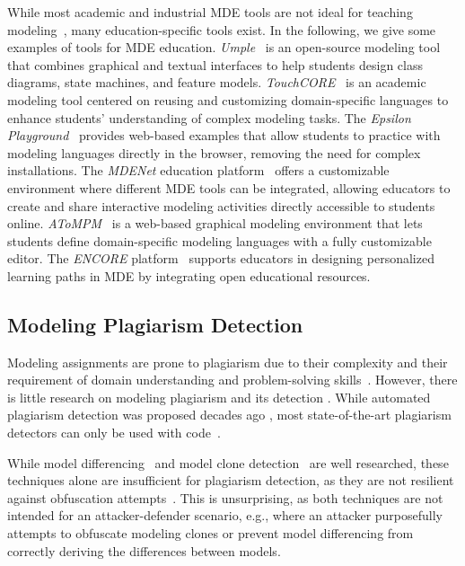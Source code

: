 While most academic and industrial \ac{MDE} tools are not ideal for teaching modeling~\cite{Kienzle2024}, many education-specific tools exist. In the following, we give some examples of tools for \ac{MDE} education.
%
\textit{Umple}~\cite{Lethbridge21} is an open-source modeling tool that combines graphical and textual interfaces to help students design class diagrams, state machines, and feature models.
\textit{TouchCORE}~\cite{ali2022} is an academic modeling tool centered on reusing and customizing domain-specific languages to enhance students' understanding of complex modeling tasks.
The \textit{Epsilon Playground}~\cite{KolovosGarciaDominguez22} provides web-based examples that allow students to practice with modeling languages directly in the browser, removing the need for complex installations.
The \textit{MDENet} education platform~\cite{Barnett2023} offers a customizable environment where different \ac{MDE} tools can be integrated, allowing educators to create and share interactive modeling activities directly accessible to students online.
\textit{AToMPM}~\cite{Syriani2013b} is a web-based graphical modeling environment that lets students define domain-specific modeling languages with a fully customizable editor.
The \textit{ENCORE} platform~\cite{ENCORE-MODELS23} supports educators in designing personalized learning paths in \ac{MDE} by integrating open educational resources.

\subsection{Modeling Plagiarism Detection}

Modeling assignments are prone to plagiarism due to their complexity and their requirement of domain understanding and problem-solving skills~\cite{Martinez2020}.
However, there is little research on modeling plagiarism and its detection \cite{Martinez2020, Saglam2022, Saglam2023}.
While automated plagiarism detection was proposed decades ago \cite{Ottenstein1976, prechelt2000}, most state-of-the-art plagiarism detectors can only be used with code~\cite{Novak2020}.

While model differencing~\cite{Stephan2013, Kolovos2009} and model clone detection~\cite{Stoerrle2015, Babur2019, Shobha2021} are well researched, these techniques alone are insufficient for plagiarism detection, as they are not resilient against obfuscation attempts~\cite{Wittler2023, Saglam2022, Martinez2020}.
This is unsurprising, as both techniques are not intended for an attacker-defender scenario, e.g., where an attacker purposefully attempts to obfuscate modeling clones or prevent model differencing from correctly deriving the differences between models.

